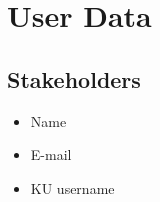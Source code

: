 
\section{User Data}

\subsection{Stakeholders}

\begin{itemize}

\item Name

\item E-mail

\item KU username

\end{itemize}

